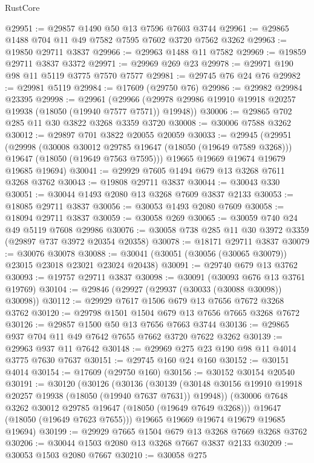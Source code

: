 \begin{lexlean}{RustCore}
\begin{coremodule}
@29951 := @29857 @1490 @50 @13 @7596 @7603 @3744
@29961 := @29865 @1488 @704 @11 @49 @7582 @7595 @7602 @3720 @7562 @3262
@29963 := @19850 @29711 @3837
@29966 := @29963 @1488 @11 @7582
@29969 := @19859 @29711 @3837 @3372
@29971 := @29969 @269 @23
@29978 := @29971 @190 @98 @11 @5119 @3775 @7570 @7577
@29981 := @29745 @76 @24 @76
@29982 := @29981 @5119
@29984 := @17609 (@29750 @76)
@29986 := @29982 @29984 @23395
@29998 := @29961
    (@29966 (@29978 @29986 @19910 @19918 @20257 @19938 (@18050 (@19940 @7577 @7571)) @19948))
@30006 := @29865 @702 @285 @11 @30 @3822 @3268 @3359 @3720
@30008 := @30006 @7588 @3262
@30012 := @29897 @701 @3822 @20055 @20059
@30033 := @29945
    (@29951
      (@29998
        (@30008 @30012 @29785 @19647 (@18050 (@19649 @7589 @3268)))
        @19647
        (@18050 (@19649 @7563 @7595)))
      @19665
      @19669
      @19674
      @19679
      @19685
      @19694)
@30041 := @29929 @7605 @1494 @679 @13 @3268 @7611 @3268 @3762
@30043 := @19808 @29711 @3837
@30044 := @30043 @330
@30051 := @30044 @1493 @2080 @13 @3268 @7609 @3837 @2133
@30053 := @18085 @29711 @3837
@30056 := @30053 @1493 @2080 @7609
@30058 := @18094 @29711 @3837
@30059 := @30058 @269
@30065 := @30059 @740 @24 @49 @5119 @7608 @29986
@30076 := @30058 @738 @285 @11 @30 @3972 @3359 (@29897 @737 @3972 @20354 @20358)
@30078 := @18171 @29711 @3837
@30079 := @30076 @30078
@30088 := @30041 (@30051 (@30056 (@30065 @30079)) @23015 @23018 @23021 @23024 @20438)
@30091 := @29740 @679 @13 @3762
@30093 := @19757 @29711 @3837
@30098 := @30091 (@30093 @676 @13 @3761 @19769)
@30104 := @29846 (@29927 (@29937 (@30033 (@30088 @30098)) @30098))
@30112 := @29929 @7617 @1506 @679 @13 @7656 @7672 @3268 @3762
@30120 := @29798 @1501 @1504 @679 @13 @7656 @7665 @3268 @7672
@30126 := @29857 @1500 @50 @13 @7656 @7663 @3744
@30136 := @29865 @937 @704 @11 @49 @7642 @7655 @7662 @3720 @7622 @3262
@30139 := @29963 @937 @11 @7642
@30148 := @29969 @275 @23 @190 @98 @11 @4014 @3775 @7630 @7637
@30151 := @29745 @160 @24 @160
@30152 := @30151 @4014
@30154 := @17609 (@29750 @160)
@30156 := @30152 @30154 @20540
@30191 := @30120
    (@30126
      (@30136
        (@30139 (@30148 @30156 @19910 @19918 @20257 @19938 (@18050 (@19940 @7637 @7631)) @19948))
        (@30006 @7648 @3262 @30012 @29785 @19647 (@18050 (@19649 @7649 @3268)))
        @19647
        (@18050 (@19649 @7623 @7655)))
      @19665
      @19669
      @19674
      @19679
      @19685
      @19694)
@30199 := @29929 @7665 @1504 @679 @13 @3268 @7669 @3268 @3762
@30206 := @30044 @1503 @2080 @13 @3268 @7667 @3837 @2133
@30209 := @30053 @1503 @2080 @7667
@30210 := @30058 @275

\end{coremodule}
\end{lexlean}

